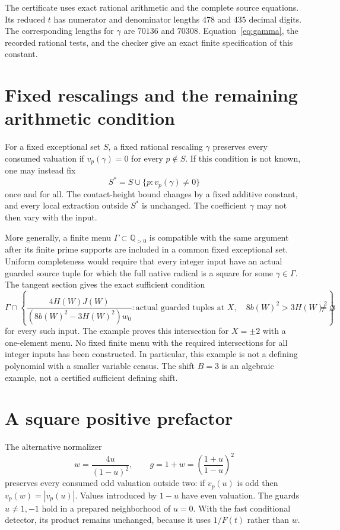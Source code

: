 \documentclass[11pt,a4paper]{article}
\newcommand{\Q}{\mathbb Q}\newcommand{\Z}{\mathbb Z}
\begin{document}
The certificate uses exact rational arithmetic and the complete
source equations. Its reduced $t$ has numerator and denominator
lengths $478$ and $435$ decimal digits. The corresponding lengths
for $\gamma$ are $70136$ and $70308$. Equation~\eqref{eq:gamma},
the recorded rational tests, and the checker give an exact finite
specification of this constant.

\section{Fixed rescalings and the remaining arithmetic condition}

For a fixed exceptional set $S$, a fixed rational rescaling $\gamma$
preserves every consumed valuation if $v_p(\gamma)=0$ for every
$p\notin S$. If this condition is not known, one may instead fix
\[
 S^*=S\cup\{p:v_p(\gamma)\ne0\}
\]
once and for all. The contact-height bound changes by a fixed additive
constant, and every local extraction outside $S^*$ is unchanged.
The coefficient $\gamma$ may not then vary with the input.

More generally, a finite menu $\Gamma\subset\Q_{>0}$ is compatible
with the same argument after its finite prime supports are included
in a common fixed exceptional set. Uniform completeness would require
that every integer input have an actual guarded source tuple for which
the full native radical is a square for some $\gamma\in\Gamma$.
The tangent section gives the exact sufficient condition
\[
 \Gamma\cap
 \left\{
 \frac{4H(W)J(W)}{(8b(W)^2-3H(W)^2)w_0}:
 \text{actual guarded tuples at }X,\quad8b(W)^2>3H(W)^2
 \right\}\ne\varnothing
\]
for every such input. The example proves this intersection for
$X=\pm2$ with a one-element menu. No fixed finite menu with the
required intersections for all integer inputs has been constructed.
In particular, this example is not a defining polynomial with a
smaller variable census. The shift $B=3$ is an algebraic example,
not a certified sufficient defining shift.

\section{A square positive prefactor}

The alternative normalizer
\[
 w=\frac{4u}{(1-u)^2},\qquad
 g=1+w=\left(\frac{1+u}{1-u}\right)^2
\]
preserves every consumed odd valuation outside two: if $v_p(u)$ is
odd then $v_p(w)=|v_p(u)|$. Values introduced by $1-u$ have even
valuation. The guards $u\ne1,-1$ hold in a prepared neighborhood
of $u=0$. With the fast conditional detector, its product remains
unchanged, because it uses $1/F(t)$ rather than $w$.
\end{document}
